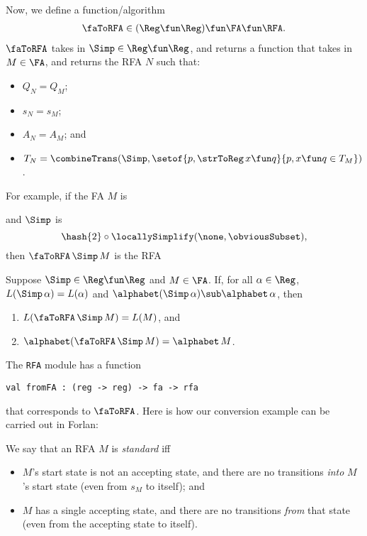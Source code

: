 Now, we define a function/algorithm
\begin{gather*}
\faToRFA\in(\Reg\fun\Reg)\fun\FA\fun\RFA .  
\end{gather*}
$\faToRFA$ takes in $\Simp\in\Reg\fun\Reg$, and returns a
function that takes in $M\in\FA$, and returns the RFA
$N$ such that:
\begin{itemize}
\item $Q_N = Q_M$;

\item $s_N = s_M$;

\item $A_N = A_M$; and

\item $T_N = \combineTrans(\Simp,
  \setof{p, \strToReg\,x\fun q}{p,x\fun q\in T_M})$.
\end{itemize}

For example, if the FA $M$ is
\begin{center}
  
\end{center}
and $\Simp$ is
\begin{displaymath}
\hash{2} \mathbin{\circ} \locallySimplify(\none,\obviousSubset) ,
\end{displaymath}
then $\faToRFA\,\Simp\,M$ is the RFA
\begin{center}
  
\end{center}

\begin{proposition}
Suppose $\Simp\in\Reg\fun\Reg$ and $M\in\FA$.  If, for all
$\alpha\in\Reg$, $L(\Simp\,\alpha)=L(\alpha)$ and
$\alphabet(\Simp\,\alpha)\sub\alphabet\,\alpha$, then
\begin{enumerate}[\quad(1)]
\item $L(\faToRFA\,\Simp\,M) = L(M)$, and

\item $\alphabet(\faToRFA\,\Simp\,M) = \alphabet\,M$.
\end{enumerate}
\end{proposition}

The \texttt{RFA} module has a function
\begin{verbatim}
val fromFA : (reg -> reg) -> fa -> rfa
\end{verbatim}
that corresponds to $\faToRFA$.
Here is how our conversion example can be carried out in Forlan:


We say that an RFA $M$ is \emph{standard} iff
\begin{itemize}
\item $M$'s start state is not an accepting state, and there are no
  transitions \emph{into} $M$'s start state (even from $s_M$ to
  itself); and

\item $M$ has a single accepting state, and there are no transitions
  \emph{from} that state (even from the accepting state to itself).
\end{itemize}

